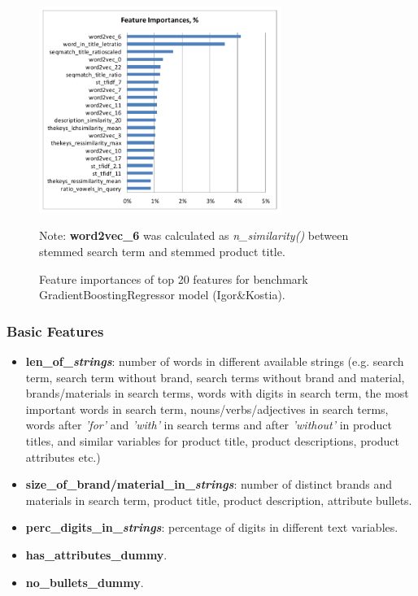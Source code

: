 \documentclass[12pt]{article}
\begin{document}
\begin{figure}
  \centering
  \includegraphics[width=0.7\textwidth]{../Fig/plot_feature_importances_benchmark.pdf}\\
  \caption{Feature importances of top 20 features for benchmark GradientBoostingRegressor model (Igor\&Kostia).}
  \label{Fig:feature_importance_IandK}
Note: \textbf{word2vec\_6} was calculated as \emph{n\_similarity()} between stemmed search term and stemmed product title.
\end{figure}

\subsubsection{Basic Features}
\label{subsubsec:Basic_Features_IandK}
\begin{itemize}
\item \textbf{len\_of\_\emph{strings}}: number of words in different available strings (e.g. search term, search term without brand, search terms without brand and material, brands/materials in search terms, words with digits in search term, the most important words in search term, nouns/verbs/adjectives in search terms, words after \emph{'for'} and \emph{'with'} in search terms and after \emph{'without'} in product titles, and similar variables for product title, product descriptions, product attributes etc.)
\item \textbf{size\_of\_brand/material\_in\_\emph{strings}}: number of distinct brands and materials in search term, product title, product description, attribute bullets.
\item \textbf{perc\_digits\_in\_\emph{strings}}: percentage of digits in different text variables.
\item \textbf{has\_attributes\_dummy}.
\item \textbf{no\_bullets\_dummy}.
\end{itemize}
\end{document}
